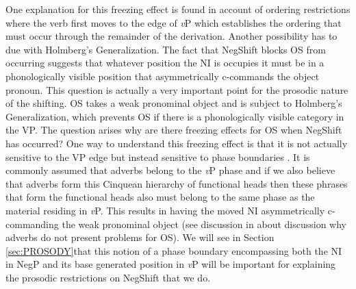 \documentclass[12pt, letterpaper]{article}
\begin{document}
One explanation for this freezing effect is found in  account of ordering restrictions where the verb first moves to the edge of \emph{v}P which establishes the ordering that must occur through the remainder of the derivation. Another possibility has to due with Holmberg's Generalization. The fact that NegShift blocks OS from occurring suggests that whatever position the NI is occupies it must be in a phonologically visible position that asymmetrically c-commands the object pronoun. This question is actually a very important point for the prosodic nature of the shifting. OS takes a weak pronominal object and is subject to Holmberg's Generalization, which prevents OS if there is a phonologically visible category in the VP. The question arises why are there freezing effects for OS when NegShift has occurred? One way to understand this freezing effect is that it is not actually sensitive to the VP edge but instead sensitive to phase boundaries \citep{chomskyMinimalistInquiriesFramework2000,chomskyDerivationPhase2001,chomskyPhases2008}. It is commonly assumed that adverbs belong to the \emph{v}P phase and if we also believe that adverbs form this Cinquean hierarchy of functional heads then these phrases that form the functional heads also must belong to the same phase as the material residing in \emph{v}P. This results in having the moved NI asymmetrically c-commanding the weak pronominal object (see discussion in \cite{brinkerhoffMATCHINGPhrasesNorwegian2021} about discussion why adverbs do not present problems for OS). We will see in Section \ref{sec:PROSODY}that this notion of a phase boundary encompassing both the NI in NegP and its base generated position in \emph{v}P will be important for explaining the prosodic restrictions on NegShift that we do.
\end{document}
